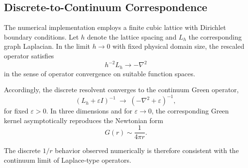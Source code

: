 \subsection{Discrete-to-Continuum Correspondence}
  \label{subsec:discrete-to-continuum-correspondence}

  The numerical implementation employs a finite cubic lattice with
  Dirichlet boundary conditions.
  Let $h$ denote the lattice spacing and $L_h$ the corresponding
  graph Laplacian.
  In the limit $h \to 0$ with fixed physical domain size,
  the rescaled operator satisfies
  \begin{equation}
    h^{-2} L_h \longrightarrow -\nabla^2
  \end{equation}
  in the sense of operator convergence on suitable function spaces.

  Accordingly, the discrete resolvent converges to the continuum Green operator,
  \begin{equation}
    (L_h + \varepsilon I)^{-1}
    \;\longrightarrow\;
    (-\nabla^2 + \varepsilon)^{-1},
  \end{equation}
  for fixed $\varepsilon > 0$.
  In three dimensions and for $\varepsilon \to 0$,
  the corresponding Green kernel asymptotically reproduces
  the Newtonian form
  \begin{equation}
    G(r) \sim \frac{1}{4\pi r}.
  \end{equation}

  The discrete $1/r$ behavior observed numerically is therefore
  consistent with the continuum limit of Laplace-type operators.
